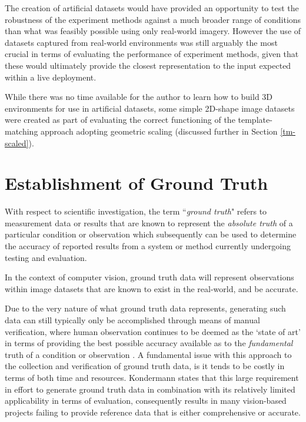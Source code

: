 The creation of artificial datasets would have provided an opportunity to test the robustness of the experiment methods against a much broader range of conditions than what was feasibly possible using only real-world imagery. However the use of datasets captured from real-world environments was still arguably the most crucial in terms of evaluating the performance of experiment methods, given that these would ultimately provide the closest representation to the input expected within a live deployment. 

While there was no time available for the author to learn how to build 3D environments for use in artificial datasets, some simple 2D-shape image datasets were created as part of evaluating the correct functioning of the template-matching approach adopting geometric scaling (discussed further in Section \ref{tm-scaled}).

\section{Establishment of Ground Truth}

With respect to scientific investigation, the term ``\textit{ground truth}" refers to measurement data or results that are known to represent the \textit{absolute truth} of a particular condition or observation which subsequently can be used to determine the accuracy of reported results from a system or method currently undergoing testing and evaluation.

In the context of computer vision, ground truth data will represent observations within image datasets that are known to exist in the real-world, and be accurate.

Due to the very nature of what ground truth data represents, generating such data can still typically only be accomplished through means of manual verification, where human observation continues to be deemed as the `state of art' in terms of providing the best possible accuracy available as to the \textit{fundamental} truth of a condition or observation \cite{kondermann}. A fundamental issue with this approach to the collection and verification of ground truth data, is it tends to be costly in terms of both time and resources. Kondermann \cite{kondermann} states that this large requirement in effort to generate ground truth data in combination with its relatively limited applicability in terms of evaluation, consequently results in many vision-based projects failing to provide reference data that is either comprehensive or accurate.

